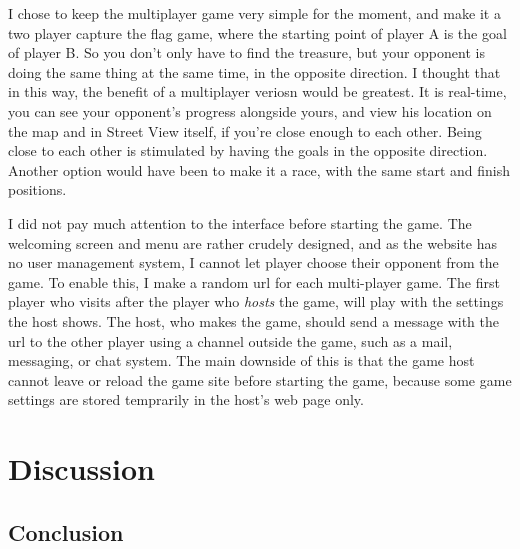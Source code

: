 \documentclass[a4paper,10pt]{article}
\begin{document}
I chose to keep the multiplayer game very simple for the moment, and make it a two player capture the flag game, where the starting point of player A is the goal of player B. So you don't only have to find the treasure, but your opponent is doing the same thing at the same time, in the opposite direction. I thought that in this way, the benefit of a multiplayer veriosn would be greatest. It is real-time, you can see your opponent's progress alongside yours, and view his location on the map and in Street View itself, if you're close enough to each other. Being close to each other is stimulated by having the goals in the opposite direction. Another option would have been to make it a race, with the same start and finish positions.

I did not pay much attention to the interface before starting the game. The welcoming screen and menu are rather crudely designed, and as the website has no user management system, I cannot let player choose their opponent from the game. To enable this, I make a random url for each multi-player game. The first player who visits after the player who \emph{hosts} the game, will play with the settings the host shows. The host, who makes the game, should send a message with the url to the other player using a channel outside the game, such as a mail, messaging, or chat system. The main downside of this is that the game host cannot leave or reload the game site before starting the game, because some game settings are stored temprarily in the host's web page only.


\section{Discussion} %
\label{sec:discussion}

\subsection{Conclusion} %
\label{sub:conclusion}

\end{document}
